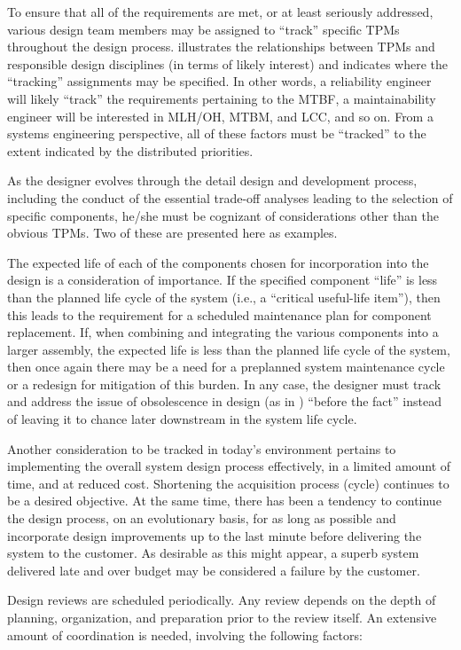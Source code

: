 To ensure that all of the requirements are met, or at least seriously addressed, various design team members may be assigned to ``track'' specific TPMs throughout the design process. illustrates the relationships between TPMs and responsible design disciplines (in terms of likely interest) and indicates where the ``tracking'' assignments may be specified. In other words, a reliability engineer will likely ``track'' the requirements pertaining to the MTBF, a maintainability engineer will be interested in MLH/OH, MTBM, and LCC, and so on. From a systems engineering perspective, all of these factors must be ``tracked'' to the extent indicated by the distributed priorities.

As the designer evolves through the detail design and development process, including the conduct of the essential trade-off analyses leading to the selection of specific components, he/she must be cognizant of considerations other than the obvious TPMs. Two of these are presented here as examples.

The expected life of each of the components chosen for incorporation into the design is a consideration of importance. If the specified component ``life'' is less than the planned life cycle of the system (i.e., a ``critical useful-life item''), then this leads to the requirement for a scheduled maintenance plan for component replacement. If, when combining and integrating the various components into a larger assembly, the expected life is less than the planned life cycle of the system, then once again there may be a need for a preplanned system maintenance cycle or a redesign for mitigation of this burden. In any case, the designer must track and address the issue of obsolescence in design (as in ) ``before the fact'' instead of leaving it to chance later downstream in the system life cycle.

Another consideration to be tracked in today’s environment pertains to implementing the overall system design process effectively, in a limited amount of time, and at reduced cost. Shortening the acquisition process (cycle) continues to be a desired objective. At the same time, there has been a tendency to continue the design process, on an evolutionary basis, for as long as possible and incorporate design improvements up to the last minute before delivering the system to the customer. As desirable as this might appear, a superb system delivered late and over budget may be considered a failure by the customer.

Design reviews are scheduled periodically. Any review depends on the depth of planning, organization, and preparation prior to the review itself. An extensive amount of coordination is needed, involving the following factors:

